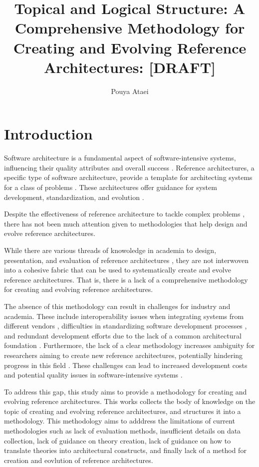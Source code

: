 \documentclass[12pt,a4paper]{article}
\title{Topical and Logical Structure: A Comprehensive Methodology for Creating and Evolving Reference Architectures: [DRAFT]}
\author{Pouya Ataei}
\date{}
\begin{document}
\maketitle

\section{Introduction}

Software architecture is a fundamental aspect of software-intensive systems, influencing their quality attributes and overall success \cite{bass2012software}. Reference architectures, a specific type of software architecture, provide a template for architecting systems for a class of problems \cite{angelov2012framework}. These architectures offer guidance for system development, standardization, and evolution \cite{cloutier2010concept}.


Despite the effectiveness of reference architecture to tackle complex problems \cite{angelov2012designing}, there has not been much attention given to methodologies that help design and evolve reference architectures. 

While there are various threads of knowoledge in academia to design, presentation, and evaluation of reference architectures \cite{dobrica2008approach,galster2011empirically,muller2008right}, they are not interwoven into a cohesive fabric that can be used to systematically create and evolve reference architectures. That is, there is a lack of a comprehensive methodology for creating and evolving reference architectures.

The absence of this methodology can result in challenges for industry and academia. These include interoperability issues when integrating systems from different vendors \cite{weyrich2015reference}, difficulties in standardizing software development processes \cite{garciamoreno2020microservices}, and redundant development efforts due to the lack of a common architectural foundation \cite{nakagawa2011aspect}. Furthermore, the lack of a clear methodology increases ambiguity for researchers aiming to create new reference architectures, potentially hindering progress in this field \cite{Angelov2012}. These challenges can lead to increased development costs and potential quality issues in software-intensive systems \cite{antinyan2020revealing}.

To address this gap, this study aims to provide a methodology for creating and evolving reference architectures. This works collects the body of knowledge on the topic of creating and evolving reference architectures, and structures it into a methodology. This methodology aims to adddress the limitations of current methodologies such as lack of evaluation methods, insufficient details on data collection, lack of guidance on theory creation, lack of guidance on how to translate theories into architectural constructs, and finally lack of a method for creation and eovlution of reference architectures.
\end{document}

